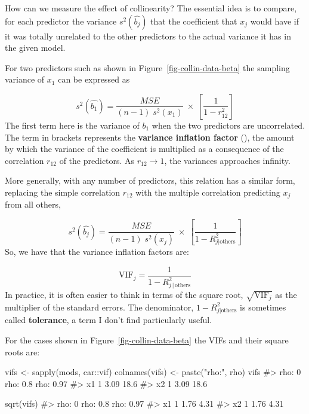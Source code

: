 \documentclass[
  letterpaper,
  10pt,
  krantz2]{krantz}
\makeatletter
\newenvironment{Shaded}{\begin{snugshade}}{\end{snugshade}}
\newcommand{\CommentTok}[1]{\textcolor[rgb]{0.37,0.37,0.37}{#1}}
\newcommand{\FunctionTok}[1]{\textcolor[rgb]{0.28,0.35,0.67}{#1}}
\newcommand{\NormalTok}[1]{\textcolor[rgb]{0.00,0.23,0.31}{#1}}
\newcommand{\OtherTok}[1]{\textcolor[rgb]{0.00,0.23,0.31}{#1}}
\newcommand{\SpecialCharTok}[1]{\textcolor[rgb]{0.37,0.37,0.37}{#1}}
\newcommand{\StringTok}[1]{\textcolor[rgb]{0.13,0.47,0.30}{#1}}
\newenvironment{kframe}{%
  \medskip{}
  \setlength{\fboxsep}{.8em}
  \def\at@end@of@kframe{}%
  \ifinner\ifhmode%
  \def\at@end@of@kframe{\end{minipage}}%
  \begin{minipage}{\columnwidth}%
  \fi\fi%
  \def\FrameCommand##1{\hskip\@totalleftmargin \hskip-\fboxsep
  \colorbox{shadecolor}{##1}\hskip-\fboxsep
      \hskip-\linewidth \hskip-\@totalleftmargin \hskip\columnwidth}%
  \MakeFramed {\advance\hsize-\width
    \@totalleftmargin\z@ \linewidth\hsize
    \@setminipage}}%
{\par\unskip\endMakeFramed%
  \at@end@of@kframe}
\renewenvironment{Shaded}{\begin{kframe}}{\end{kframe}}
\makeatother
\begin{document}
How can we measure the effect of collinearity? The essential idea is to
compare, for each predictor the variance \(s^2 (\widehat{b_j})\) that
the coefficient that \(x_j\) would have if it was totally unrelated to
the other predictors to the actual variance it has in the given model.

For two predictors such as shown in Figure~\ref{fig-collin-data-beta}
the sampling variance of \(x_1\) can be expressed as

\[
s^2 (\widehat{b_1}) = \frac{MSE}{(n-1) \; s^2(x_1)} \; \times \; \left[ \frac{1}{1-r^2_{12}} \right]
\] The first term here is the variance of \(b_1\) when the two
predictors are uncorrelated. The term in brackets represents the
\textbf{variance inflation factor}
(), the amount by which
the variance of the coefficient is multiplied as a consequence of the
correlation \(r_{12}\) of the predictors. As \(r_{12} \rightarrow 1\),
the variances approaches infinity.

More generally, with any number of predictors, this relation has a
similar form, replacing the simple correlation \(r_{12}\) with the
multiple correlation predicting \(x_j\) from all others,

\[
s^2 (\widehat{b_j}) = \frac{MSE}{(n-1) \; s^2(x_j)} \; \times \; \left[ \frac{1}{1-R^2_{j | \text{others}}} \right]
\] So, we have that the variance inflation factors are:

\[
\text{VIF}_j = \frac{1}{1-R^2_{j \,|\, \text{others}}} 
\] In practice, it is often easier to think in terms of the square root,
\(\sqrt{\text{VIF}_j}\) as the multiplier of the standard errors. The
denominator, \(1-R^2_{j | \text{others}}\) is sometimes called
\textbf{tolerance}, a term I don't find particularly useful.

For the cases shown in Figure~\ref{fig-collin-data-beta} the VIFs and
their square roots are:

\begin{Shaded}
\begin{Highlighting}[]
\NormalTok{vifs }\OtherTok{\textless{}{-}} \FunctionTok{sapply}\NormalTok{(mods, car}\SpecialCharTok{::}\NormalTok{vif)}
\FunctionTok{colnames}\NormalTok{(vifs) }\OtherTok{\textless{}{-}} \FunctionTok{paste}\NormalTok{(}\StringTok{"rho:"}\NormalTok{, rho)}
\NormalTok{vifs}
\CommentTok{\#\textgreater{}    rho: 0 rho: 0.8 rho: 0.97}
\CommentTok{\#\textgreater{} x1      1     3.09      18.6}
\CommentTok{\#\textgreater{} x2      1     3.09      18.6}

\FunctionTok{sqrt}\NormalTok{(vifs)}
\CommentTok{\#\textgreater{}    rho: 0 rho: 0.8 rho: 0.97}
\CommentTok{\#\textgreater{} x1      1     1.76      4.31}
\CommentTok{\#\textgreater{} x2      1     1.76      4.31}
\end{Highlighting}
\end{Shaded}
\end{document}
